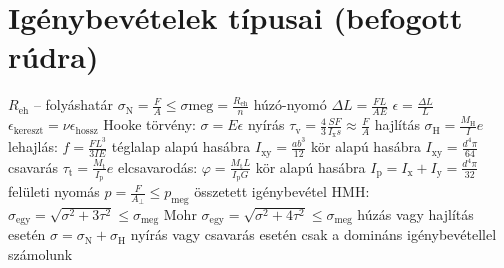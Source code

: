 \section{Igénybevételek típusai (befogott rúdra)}%

\begin{outline}
	\1 $R_\text{eh}$ -- folyáshatár
	\1 $\sigma_\text{N} = \frac{F}{A}\le\sigma\text{meg}=\frac{R_\text{eh}}{n}$
	\1 húzó-nyomó
		\2 $\Delta L = \frac{FL}{AE}$
		\2 $\epsilon = \frac{\Delta L}{L}$
		\2 $\epsilon_\text{kereszt} = \nu\epsilon_\text{hossz}$
		\2 Hooke törvény: $\sigma=E\epsilon$
	\1 nyírás
		\2 $\tau_\text{v} = \frac{4}{3}\frac{SF}{I_\text{x}s} \approx \frac{F}{A}$
	\1 hajlítás
		\2 $\sigma_\text{H} = \frac{M_\text{H}}{I}e$
		\2 lehajlás: $f = \frac{FL^3}{3IE}$
		\2 téglalap alapú hasábra $I_\text{xy}=\frac{ab^3}{12}$
		\2 kör alapú hasábra $I_\text{xy}=\frac{d^4\pi}{64}$
	\1 csavarás
		\2 $\tau_\text{t} = \frac{M_\text{t}}{I_\text{p}}e$
		\2 elcsavarodás: $\varphi = \frac{M_\text{t}L}{I_\text{p}G}$
		\2 kör alapú hasábra $I_\text{p}=I_\text{x}+I_\text{y}=\frac{d^4\pi}{32}$
	\1 felületi nyomás
		\2 $p = \frac{F}{A_\perp}\le p_\text{meg}$
	\1 összetett igénybevétel
		\2 HMH: $\sigma_\text{egy} = \sqrt{\sigma^2+3\tau^2}\le\sigma_\text{meg}$
		\2 Mohr $\sigma_\text{egy} = \sqrt{\sigma^2+4\tau^2}\le\sigma_\text{meg}$
		\2 húzás vagy hajlítás esetén $\sigma = \sigma_\text{N}+\sigma_\text{H}$
		\2 nyírás vagy csavarás esetén csak a domináns igénybevétellel számolunk
\end{outline}
